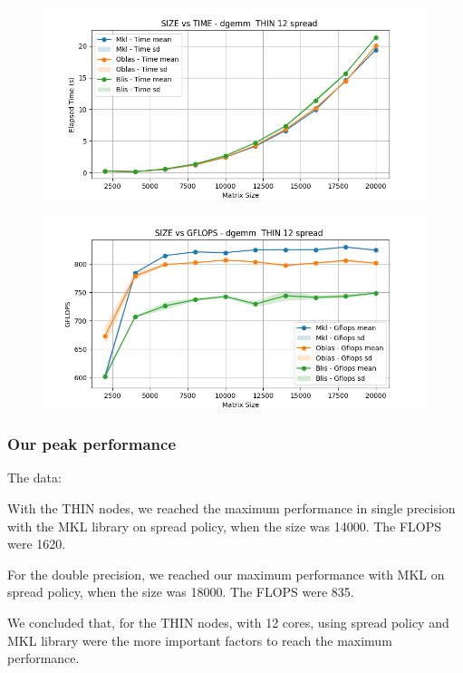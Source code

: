 \documentclass{article}
\begin{document}
\begin{figure}[H]
    \centering
    \includegraphics[width=\textwidth]{THIN 12/dgemm__THIN_12_spread_time.png}
\end{figure}

\begin{figure}[H]
    \centering
    \includegraphics[width=\textwidth]{THIN 12/dgemm__THIN_12_spread_gflops.png}
\end{figure}



\subsubsection{Our peak performance}
The data:

With the THIN nodes, we reached the maximum performance in single precision with the MKL library on spread policy, when the size was 14000. The FLOPS were 1620.

For the double precision, we reached our maximum performance with MKL on spread policy, when the size was 18000. The FLOPS were 835. 

We concluded that, for the THIN nodes, with 12 cores, using spread policy and MKL library were the more important factors to reach the maximum performance. 
\end{document}
